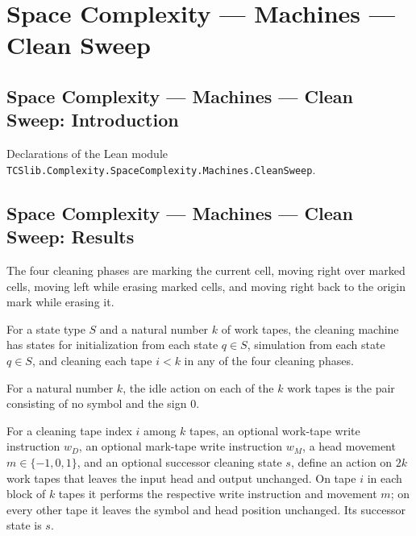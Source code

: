 \section{Space Complexity --- Machines --- Clean Sweep}
\subsection*{Space Complexity --- Machines --- Clean Sweep: Introduction}

Declarations of the Lean module \texttt{TCSlib.Complexity.SpaceComplexity.Machines.CleanSweep}.

\subsection*{Space Complexity --- Machines --- Clean Sweep: Results}

\begin{definition}
\label{Complexity.LogProg.CPh}
\leanok
The four cleaning phases are marking the current cell, moving right over marked cells,
moving left while erasing marked cells, and moving right back to the origin mark while
erasing it.
\end{definition}

\begin{definition}
\label{Complexity.LogProg.CleanSt}
\leanok
{}
For a state type $S$ and a natural number $k$ of work tapes, the cleaning machine has
states for initialization from each state $q\in S$, simulation from each state $q\in S$,
and cleaning each tape $i<k$ in any of the four cleaning phases.
\end{definition}

\begin{definition}
\label{Complexity.LogProg.idleK}
\leanok
For a natural number $k$, the idle action on each of the $k$ work tapes is the pair
consisting of no symbol and the sign $0$.
\end{definition}

\begin{definition}
\label{Complexity.LogProg.clAct}
\leanok
{}
For a cleaning tape index $i$ among $k$ tapes, an optional work-tape write instruction
$w_D$, an optional mark-tape write instruction $w_M$, a head movement $m\in\{-1,0,1\}$,
and an optional successor cleaning state $s$, define an action on $2k$ work tapes that
leaves the input head and output unchanged. On tape $i$ in each block of $k$ tapes it
performs the respective write instruction and movement $m$; on every other tape it
leaves the symbol and head position unchanged. Its successor state is $s$.
\end{definition}

